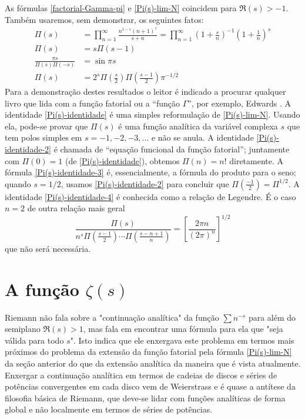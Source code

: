     As fórmulas \eqref{factorial-Gamma-pi} e \eqref{Pi(s)-lim-N} coincidem para $\Re(s)> -1$. Também usaremos, sem demonstrar, os seguintes fatos:
    \begin{align}
        \Pi(s) &= \prod_{n=1}^{\infty}\frac{n^{1-s}(n+1)^s}{s+n} =  \prod_{n=1}^{\infty}\left(1 + \frac{s}{n}\right)^{-1} \left(1 + \frac{1}{n}\right)^{s} \label{Pi(s)-identidade} \\[0.3cm]
        \Pi(s) &= s\Pi(s-1) \label{Pi(s)-identidade-2} \\[0.3cm]
        \frac{\pi s}{\Pi(s)\Pi(-s)} &= \sin \pi s  \label{Pi(s)-identidade-3} \\[0.3cm]
        \Pi(s) &= 2^s\Pi\left(\frac{s}{2}\right)\Pi\left(\frac{s-1}{2}\right)\pi^{-1/2} \label{Pi(s)-identidade-4}
    \end{align}
    Para a demonstração destes resultados o leitor é indicado a procurar qualquer livro que lida com a função fatorial ou a ``função $\Gamma$'', por exemplo, Edwards \cite{MR1319337}. 
    A identidade \eqref{Pi(s)-identidade} é uma simples reformulação 
    de \eqref{Pi(s)-lim-N}. Usando ela, pode-se provar que $\Pi(s)$ é uma 
    função analítica da variável complexa $s$ que tem polos simples 
    em $s = -1, -2, -3, \dots$ e não se anula. 
    A identidade \eqref{Pi(s)-identidade-2} é chamada de 
    ``equação funcional da função fatorial''; 
    juntamente com $\Pi(0)=1$ (de \eqref{Pi(s)-identidade}), 
    obtemos $\Pi(n) = n!$ diretamente. A fórmula \eqref{Pi(s)-identidade-3} é, 
    essencialmente, a fórmula do produto para o seno; quando $s = 1/2$, 
    usamos \eqref{Pi(s)-identidade-2} para concluir que 
    $\Pi(\frac{-1}{2}) = \Pi^{1/2}$. 
    A identidade \eqref{Pi(s)-identidade-4} é conhecida como a relação 
    de Legendre. É o caso $n=2$ de outra relação mais geral
    \begin{equation*}
        \frac{\Pi(s)}{n^s \Pi\left( \frac{s-1}{2}\right) \cdots \Pi\left( \frac{s-n + 1}{n}\right)} 
        = \left[ \frac{2\pi n}{(2\pi)^n}\right]^{1/2}
    \end{equation*}
    que não será necessária.
    
    
    \section{A função $\zeta(s)$}
    
    
    Riemann não fala sobre a "continuação analítica" da função $\sum n^{-s}$ para além do semiplano $\Re(s)>1$, mas fala em encontrar uma fórmula para ela que "seja válida para todo $s$". Isto indica que ele enxergava este problema em termos mais próximos do problema da extensão da função fatorial pela fórmula \eqref{Pi(s)-lim-N} da seção anterior do que da extensão analítica da maneira que é vista atualmente. Enxergar a continuação analítica em termos de cadeias de discos e séries de potências convergentes em cada disco vem de Weierstrass e é quase a antítese da filosofia básica de Riemann, que deve-se lidar com funções analíticas de forma global e não localmente em termos de séries de potências. 
    
